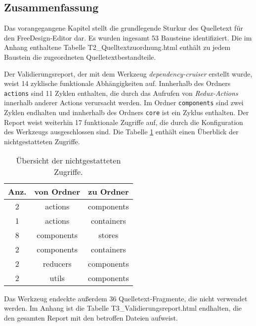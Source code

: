 \subsection{Zusammenfassung}
Das vorangegangene Kapitel stellt die grundlegende Sturkur des Quelletext für den FreeDesign-Editor dar. 
Es wurden ingesamt 53 Bausteine identifiziert. Die im Anhang enthaltene Tabelle T2\_Quelltextzuordnung.html enthält zu jedem Baustein die zugeordneten Quelletextbestandteile.  

Der Validierungsreport, der mit dem Werkzeug \emph{dependency-cruiser} erstellt wurde, weist 14 zyklische funktionale Abhängigkeiten auf.
Innherhalb des Ordners \lstinline|actions| sind 11 Zyklen enthalten, die durch das Aufrufen von \emph{Redux-Actions} innerhalb anderer Actions verursacht werden. 
Im Ordner \lstinline|components| sind zwei Zyklen endhalten und innherhalb des Ordners \lstinline|core| ist ein Zyklus enthalten.
Der Report weist weiterhin 17 funktionale Zugriffe auf, die durch die Konfiguration des Werkzeugs ausgeschlossen sind. 
Die Tabelle \ref{table:not_allowed} enthält einen Überblick der nichtgestatteten Zugriffe.

\begin{table}[H]
    \centering
    \caption{Übersicht der nichtgestatteten Zugriffe.}
    \begin{tabular}{c|c|c}        
        \label{table:not_allowed}
        Anz. & von Ordner & zu Ordner \\
        \hline
        2 & actions & components \\
        1 & actions & containers \\
        8 & components & stores \\
        2 & components & containers \\
        2 & reducers & components \\
        2 & utils & components \\
    \end{tabular}
\end{table}    
 
Das Werkzeug endeckte außerdem 36 Quelletext-Fragmente, die nicht verwendet werden. 
Im Anhang ist die Tabelle T3\_Validierungsreport.html endhalten, die den gesamten Report mit den betroffen Dateien aufweist. 



